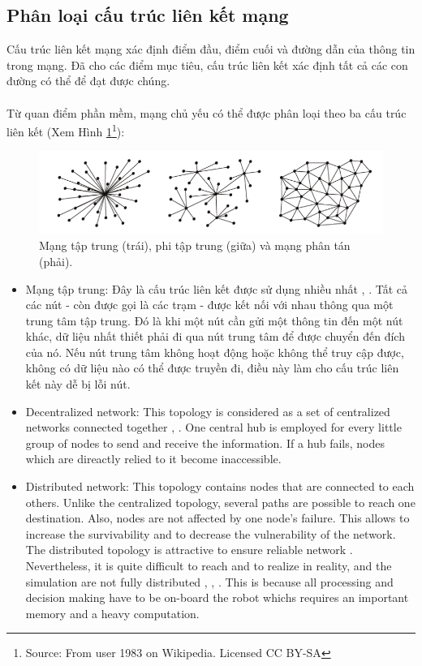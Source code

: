 \documentclass[11pt,openany]{book}
\begin{document}
\subsection{Phân loại cấu trúc liên kết mạng}
Cấu trúc liên kết mạng xác định điểm đầu, điểm cuối và đường dẫn của thông tin trong mạng. Đã cho các điểm mục tiêu, cấu trúc liên kết xác định tất cả các con đường có thể để đạt được chúng.\\\\
Từ quan điểm phần mềm, mạng chủ yếu có thể được phân loại theo ba cấu trúc liên kết (Xem Hình \ref{fig:4.2}\footnote{Source: From user 1983 on Wikipedia. Licensed CC BY-SA}):
\begin{figure}[H]
    \centering
    \includegraphics[scale=0.4]{assets/4_2.png}
    \caption{Mạng tập trung (trái), phi tập trung (giữa) và mạng phân tán (phải).}
    \label{fig:4.2}
\end{figure}
\begin{itemize}
    \item Mạng tập trung: Đây là cấu trúc liên kết được sử dụng nhiều nhất \cite{morgenthaler2012uavnet}, \cite{forster2013collaborative}. Tất cả các nút - còn được gọi là các trạm - được kết nối với nhau thông qua một trung tâm tập trung. Đó là khi một nút cần gửi một thông tin đến một nút khác, dữ liệu nhất thiết phải đi qua nút trung tâm để được chuyển đến đích của nó. Nếu nút trung tâm không hoạt động hoặc không thể truy cập được, không có dữ liệu nào có thể được truyền đi, điều này làm cho cấu trúc liên kết này dễ bị lỗi nút.
    \item Decentralized network: This topology is considered as a set of centralized networks connected together \cite{konolige2003map}, \cite{brand2014stereo}. One central hub is employed for every little group of nodes to send and receive the information. If a hub fails, nodes which are direactly relied to it become inaccessible.
    \item Distributed network: This topology contains nodes that are connected to each others. Unlike the centralized topology, several paths are possible to reach one destination. Also, nodes are not affected by one node's failure. This allows to increase the survivability and to decrease the vulnerability of the network. The distributed topology is attractive to ensure reliable network \cite{cunningham2010ddf}. Nevertheless, it is quite difficult to reach and to realize in reality, and the simulation are not fully distributed \cite{waharte2009coordinated}, \cite{cameron2009collaborative}, \cite{scherer2015autonomous}. This is because all processing and decision making have to be on-board the robot whichs requires an important memory and a heavy computation.
\end{itemize}
\end{document}
